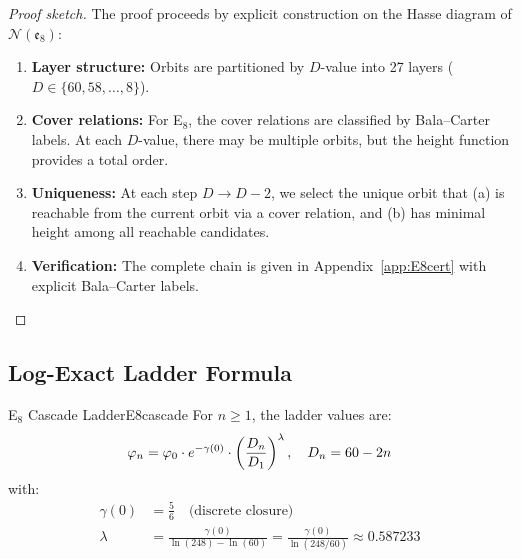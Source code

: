 \begin{proof}[Proof sketch]
The proof proceeds by explicit construction on the Hasse diagram of 
$\mathcal{N}(\mathfrak{e}_8)$:
\begin{enumerate}[leftmargin=1.5em, topsep=2pt, itemsep=1pt]
    \item \textbf{Layer structure:} Orbits are partitioned by $D$-value into 
        27 layers ($D \in \{60, 58, \ldots, 8\}$).
    \item \textbf{Cover relations:} For E$_8$, the cover relations are classified 
        by Bala--Carter labels. At each $D$-value, there may be multiple orbits, 
        but the height function provides a total order.
    \item \textbf{Uniqueness:} At each step $D \to D-2$, we select the unique 
        orbit that (a) is reachable from the current orbit via a cover relation, 
        and (b) has minimal height among all reachable candidates.
    \item \textbf{Verification:} The complete chain is given in Appendix~\ref{app:E8cert} 
        with explicit Bala--Carter labels.
\end{enumerate}
\end{proof}

\subsection{Log-Exact Ladder Formula}

\begin{definition}{E$_8$ Cascade Ladder}{E8cascade}
For $n \geq 1$, the ladder values are:
\begin{equation}
    \varphi_n = \varphi_0 \cdot e^{-\gamma(0)} \cdot 
        \left(\frac{D_n}{D_1}\right)^\lambda, \quad D_n = 60 - 2n
    \label{eq:ladder}
\end{equation}
with:
\begin{align}
    \gamma(0) &= \frac{5}{6} \quad \text{(discrete closure)}\\
    \lambda &= \frac{\gamma(0)}{\ln(248) - \ln(60)} = \frac{\gamma(0)}{\ln(248/60)} 
        \approx 0.587233
\end{align}
\end{definition}

